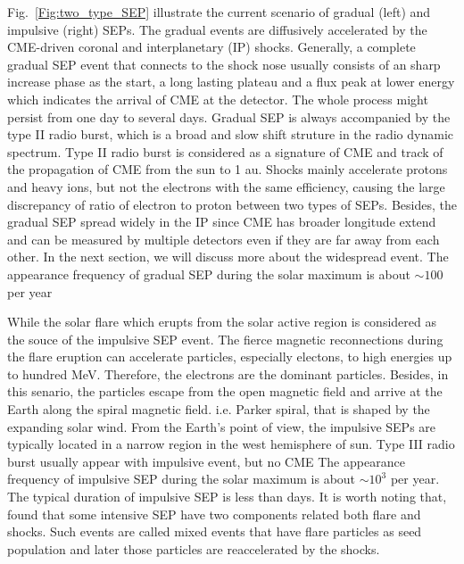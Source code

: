 Fig.~\ref{Fig:two_type_SEP} illustrate the current scenario of gradual (left) and impulsive (right) \acp{SEP}.
The gradual events are diffusively accelerated by the CME-driven coronal and interplanetary (IP) shocks. Generally, a complete gradual \ac{SEP} event that connects to the shock nose usually consists of an sharp increase phase as the start, a long lasting plateau and a flux peak at lower energy which indicates the arrival of \ac{CME} at the detector. The whole process might persist from one day to several days. Gradual \ac{SEP} is always accompanied by the type II radio burst, which is a broad and slow shift struture in the radio dynamic spectrum. Type II radio burst is considered as a signature of \ac{CME} and track of the propagation of \ac{CME} from the sun to 1 au. Shocks mainly accelerate protons and heavy ions, but not the electrons with the same efficiency, causing the large discrepancy of ratio of electron to proton between two types of \acp{SEP}.
Besides, the gradual \ac{SEP} spread widely in the IP since \ac{CME} has broader longitude extend and can be measured by multiple detectors even if they are far away from each other. In the next section, we will discuss more about the widespread event. The appearance frequency of gradual \ac{SEP} during the solar maximum is about $\sim 100$ per year

While the solar flare which erupts from the solar active region is considered as the souce of the impulsive \ac{SEP} event. The fierce magnetic reconnections during the flare eruption can accelerate particles, especially electons, to high energies up to hundred MeV. Therefore, the electrons are the dominant particles. Besides, in this senario, the particles escape from the open magnetic field and arrive at the Earth along the spiral magnetic field. i.e. Parker spiral, \citep{Parker-1958} that is shaped by the expanding solar wind. From the Earth's point of view, the impulsive \acp{SEP} are typically located in a narrow region in the west hemisphere of sun. Type III radio burst usually appear with impulsive event, but no \ac{CME}
The appearance frequency of impulsive \ac{SEP} during the solar maximum is about $\sim 10^3$ per year. The typical duration of impulsive \ac{SEP} is less than days.
It is worth noting that, \citep{cane2003two} found that some intensive \ac{SEP} have two components related both flare and shocks. Such events are called mixed events that have flare particles as seed population and later those particles are reaccelerated by the shocks. %

